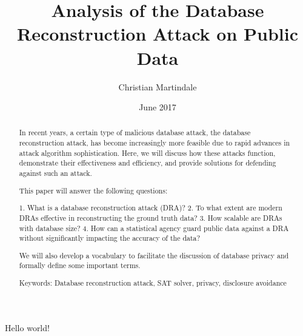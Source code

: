 \documentclass[12pt]{article}
\title{Analysis of the Database Reconstruction Attack on Public Data}
\author{Christian Martindale}
\date{June 2017}
\begin{document}
\begin{abstract}
In recent years, a certain type of malicious database attack,
the database reconstruction attack, has become increasingly
more feasible due to rapid advances in attack algorithm
sophistication. Here, we will discuss how these attacks
function, demonstrate their effectiveness and efficiency,
and provide solutions for defending against such an attack.

This paper will answer the following questions:

1. What is a database reconstruction attack (DRA)?
2. To what extent are modern DRAs effective in reconstructing
the ground truth data?
3. How scalable are DRAs with database size?
4. How can a statistical agency guard public data against a DRA without
significantly impacting the accuracy of the data?

We will also develop a vocabulary to facilitate the discussion
of database privacy and formally define some important terms.

Keywords: Database reconstruction attack, SAT solver, privacy,
disclosure avoidance
\end{abstract}

Hello world!
\end{document}
